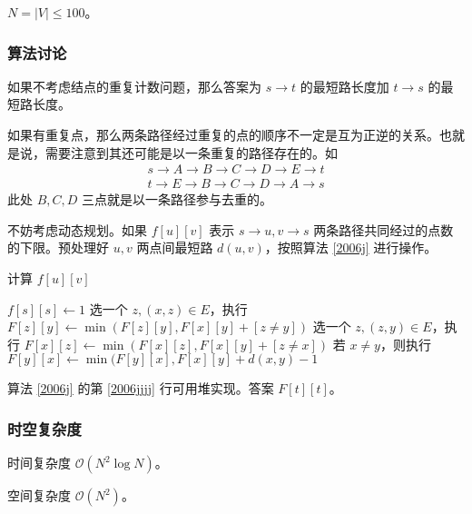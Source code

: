 				$N = |V| \le 100%
				$。
				
			\subsubsection{算法讨论}
				如果不考虑结点的重复计数问题，那么答案为 $s \rightarrow t$ 的最短路长度加 $t \rightarrow s$ 的最短路长度。
				
				如果有重复点，那么两条路径经过重复的点的顺序不一定是互为正逆的关系。也就是说，需要注意到其还可能是以一条重复的路径存在的。如
				\begin{align}
						s \rightarrow A \rightarrow B \rightarrow C \rightarrow D \rightarrow E  \rightarrow t  \\
						t \rightarrow E \rightarrow B \rightarrow C \rightarrow D \rightarrow A \rightarrow s
				\end{align}
				此处 $B, C, D$ 三点就是以一条路径参与去重的。
				
				不妨考虑动态规划。如果 $f[u][v]$ 表示 $s \rightarrow u, v \rightarrow s$ 两条路径共同经过的点数的下限。预处理好 $u, v$ 两点间最短路 $d(u, v)$，按照算法 \ref{2006j} 进行操作。

				\begin{algorithm}[H]
				\caption{计算 $f[u][v]$}
				\label{2006j}
					\begin{algorithmic}[1]
						\State $f[s][s] \gets 1$
						 \label{2006jjjj}
								\State 选一个 $z, (x, z) \in E$，执行 $F[z][y] \gets \min(F[z][y], F[x][y] + [z \ne y])$
								\State 选一个 $z, (z, y) \in E$，执行 $F[x][z] \gets \min(F[x][z], F[x][y] + [z \ne x])$ 
								\State 若 $x \ne y$，则执行 $F[y][x] \gets \min(F[y][x], F[x][y] + d(x, y) - 1$ 
						\EndFor
					\end{algorithmic}
				\end{algorithm}
				
				算法 \ref{2006j} 的第 \ref{2006jjjj} 行可用堆实现。答案 $F[t][t]$。

			\subsubsection{时空复杂度}
				
				时间复杂度 $\mathcal{O}\left(N^2\log N\right)$。
					
				空间复杂度 $\mathcal{O}\left(N^2\right)$。
		\newpage